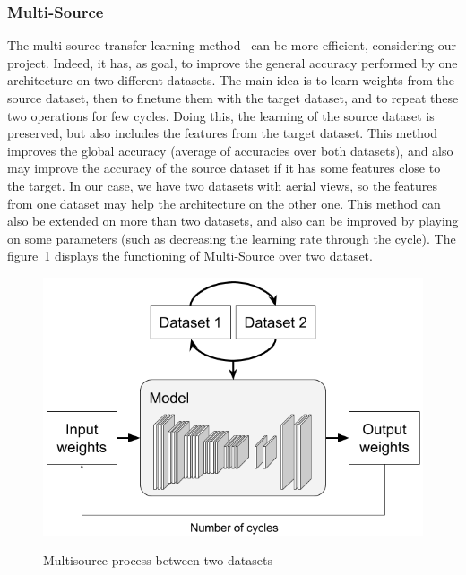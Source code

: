 \subsubsection{Multi-Source}
The multi-source transfer learning method~\cite{KAND16} can be more efficient, considering our project. Indeed, it has, as goal, to improve the general accuracy performed by one architecture on two different datasets. The main idea is to learn weights from the source dataset, then to finetune them with the target dataset, and to repeat these two operations for few cycles. Doing this, the learning of the source dataset is preserved, but also includes the features from the target dataset. This method improves the global accuracy (average of accuracies over both datasets), and also may improve the accuracy of the source dataset if it has some features close to the target. In our case, we have two datasets with aerial views, so the features from one dataset may help the architecture on the other one. This method can also be extended on more than two datasets, and also can be improved by playing on some parameters (such as decreasing the learning rate through the cycle). The figure~\ref{fig:part2:multisource} displays the functioning of Multi-Source over two dataset.

\begin{figure}[ht!]
  \includegraphics[width=0.8\linewidth,center]{images/part2/multisource.png}
  \caption{Multisource process between two datasets}\textbf{
  \label{fig:part2:multisource}}
\end{figure}





